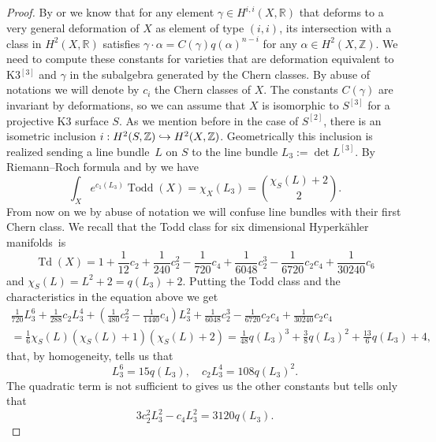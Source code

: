 \documentclass[11pt]{article}
\newcommand\hto{\mathrel{\lhook\joinrel\to}}
\theoremstyle{plain}
\theoremstyle{definition}
\newcommand{\R}{\ensuremath{\mathbb{R}}}
\newcommand{\Z}{\ensuremath{\mathbb{Z}}}
\DeclareMathOperator{\Td}{Td}
\DeclareMathOperator{\Todd}{Todd}
\begin{document}
\begin{proof}
By \cite[Rem.\,4.12]{F87} or \cite[Th.\,5.12]{Huy97} we know that for any element $\gamma\in H^{i,i}(X, \R)$ that deforms to a very general deformation of $X$ as element of type $(i,i)$, its intersection with a class in $H^2(X, \R)$ satisfies $\gamma\cdot \alpha =C(\gamma)q(\alpha)^{n-i}$ for any $\alpha \in H^2(X,\Z)$. We need to compute these constants for varieties that are deformation equivalent to K3$^{[3]}$ and $\gamma$ in the subalgebra generated by the Chern classes. By abuse of notations we will denote by $c_i$ the Chern classes of $X$. The constants $C(\gamma)$ are invariant by deformations, so we can assume that $X$ is isomorphic to $S^{[3]}$ for a projective K3 surface $S$. As we mention before in the case of $S^{[2]}$, there is an isometric inclusion $i:H^2(S,\Z)\hto H^2(X, \Z)$. Geometrically this inclusion is realized sending a line bundle~$L$ on $S$ to the line bundle $L_3:=\det L^{[3]}$. By Riemann--Roch formula and by \cite[Lem.\,5.1]{EGL01} we have\vspace*{-3pt}
\[\int_X e^{c_1(L_3)} \Todd(X) =\chi_X (L_3)=\binom{\chi_S(L)+2}{2}.\]
From now on we by abuse of notation we will confuse line bundles with their first Chern class. We recall that the Todd class for six dimensional Hyperkähler manifolds~is\vspace*{-3pt}%
\begin{equation}\label{todd}
\Td(X)=1+\frac{1}{12}c_2+\frac{1}{240}c_2^2-\frac{1}{720}c_4+\frac{1}{6048}c_2^3-\frac{1}{6720}c_2c_4+\frac{1}{30240}c_6
\end{equation}
and $\chi_S(L)=L^2+2=q(L_3)+2$.
Putting the Todd class and the characteristics in the equation above we get\vspace*{-3pt}
\begin{multline*}
\frac{1}{720}L_3^6+\frac{1}{288}c_2 L_3^4+(\frac{1}{480}c_2^2-\frac{1}{1440}c_4)L_3^2+\frac{1}{6048}c_2^3-\frac{1}{6720}c_2c_4+\frac{1}{30240}c_2c_4\\
=\frac{1}{6}\chi_S(L)(\chi_S(L)+1)(\chi_S(L)+2)=\frac{1}{48}q(L_3)^3+\frac{3}{8} q(L_3)^2+\frac{13}{6}q(L_3)+4,
\end{multline*}
that, by homogeneity, tells us that\vspace*{-3pt}
\[L_3^6=15q(L_3),\quad c_2 L_3^4=108q(L_3)^2.\]
The quadratic term is not sufficient to gives us the other constants but tells only that\vspace*{-3pt}%
\begin{equation}\label{chernintersectionone}
3c_2^2L_3^2-c_4L_3^2=3120q(L_3).

\end{equation}
\end{proof}
\end{document}
